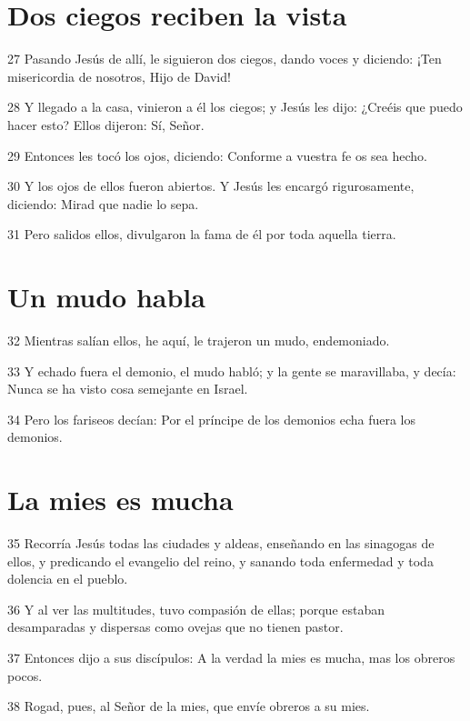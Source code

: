 \section*{Dos ciegos reciben la vista}

\par 27 Pasando Jesús de allí, le siguieron dos ciegos, dando voces y diciendo: ¡Ten misericordia de nosotros, Hijo de David!
\par 28 Y llegado a la casa, vinieron a él los ciegos; y Jesús les dijo: ¿Creéis que puedo hacer esto? Ellos dijeron: Sí, Señor.
\par 29 Entonces les tocó los ojos, diciendo: Conforme a vuestra fe os sea hecho.
\par 30 Y los ojos de ellos fueron abiertos. Y Jesús les encargó rigurosamente, diciendo: Mirad que nadie lo sepa.
\par 31 Pero salidos ellos, divulgaron la fama de él por toda aquella tierra.

\section*{Un mudo habla}

\par 32 Mientras salían ellos, he aquí, le trajeron un mudo, endemoniado.
\par 33 Y echado fuera el demonio, el mudo habló; y la gente se maravillaba, y decía: Nunca se ha visto cosa semejante en Israel.
\par 34 Pero los fariseos decían: Por el príncipe de los demonios echa fuera los demonios.

\section*{La mies es mucha}

\par 35 Recorría Jesús todas las ciudades y aldeas, enseñando en las sinagogas de ellos, y predicando el evangelio del reino, y sanando toda enfermedad y toda dolencia en el pueblo.
\par 36 Y al ver las multitudes, tuvo compasión de ellas; porque estaban desamparadas y dispersas como ovejas que no tienen pastor.
\par 37 Entonces dijo a sus discípulos: A la verdad la mies es mucha, mas los obreros pocos.
\par 38 Rogad, pues, al Señor de la mies, que envíe obreros a su mies.


